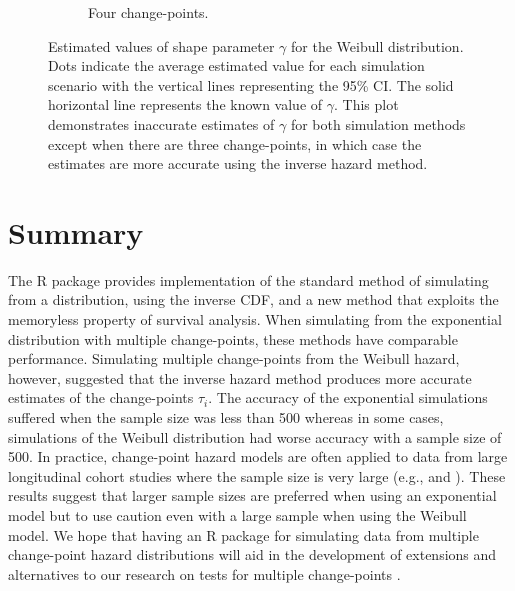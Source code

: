 \begin{figure}[ht]
\begin{subfigure}[b]{0.45\textwidth}
         \caption{Four change-points.}
         \label{fig:weib4gplot}
     \end{subfigure}
    \caption{Estimated values of shape parameter $\gamma$ for the Weibull distribution. Dots indicate the average estimated value for each simulation scenario with the vertical lines representing the 95\% CI. The solid horizontal line represents the known value of $\gamma$. This plot demonstrates inaccurate estimates of $\gamma$ for both simulation methods except when there are three change-points, in which case the estimates are more accurate using the inverse hazard method.}
    \label{fig:weibgplots}
\end{figure}

\section{Summary}

The R package  provides implementation of the standard method of simulating from a distribution, using the inverse CDF, and a new method that exploits the memoryless property of survival analysis. When simulating from the exponential distribution with multiple change-points, these methods have comparable performance. Simulating multiple change-points from the Weibull hazard, however, suggested that the inverse hazard method produces more accurate estimates of the change-points $\tau_i$. The accuracy of the exponential simulations suffered when the sample size was less than 500 whereas in some cases, simulations of the Weibull distribution had worse accuracy with a sample size of 500. In practice, change-point hazard models are often applied to data from large longitudinal cohort studies where the sample size is very large (e.g., \cite{Goodman} and \cite{Williams}). These results suggest that larger sample sizes are preferred when using an exponential model but to use caution even with a large sample when using the Weibull model. We hope that having an R package for simulating data from multiple change-point hazard distributions will aid in the development of extensions and alternatives to our research on tests for multiple change-points \citep{Hochheimer2}. 

